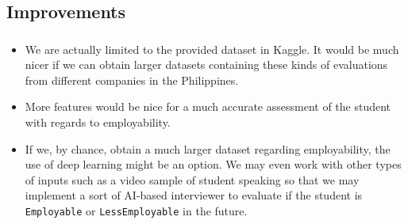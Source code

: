 \subsection{Improvements}
\begin{frame}
\frametitle{\subsecname}
	\begin{itemize}
		\item We are actually limited to the provided dataset in Kaggle. It would be much nicer if we can obtain larger datasets containing these kinds of evaluations from different companies in the Philippines.
		\item More features would be nice for a much accurate assessment of the student with regards to employability.
		\item If we, by chance, obtain a much larger dataset regarding employability, the use of deep learning might be an option. We may even work with other types of inputs such as a video sample of student speaking so that we may implement a sort of AI-based interviewer to evaluate if the student is \texttt{Employable} or \texttt{LessEmployable} in the future.
	\end{itemize}
\end{frame}
